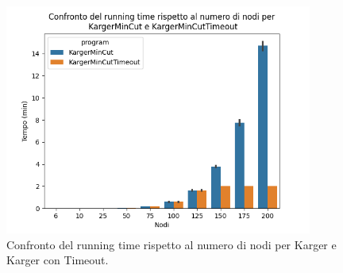 \begin{figure}[H]
    \centering

    \includegraphics[width=0.9\textwidth]{./images/Confronto_del_running_time_rispetto_al_numero_di_nodi_per__KargerMinCut_e_KargerMinCutTimeout.png}

    \caption{Confronto del running time rispetto al numero di nodi per Karger e Karger con Timeout.}
    \label{fig:karger-vs-kargertout-runtime-chart}
\end{figure}
